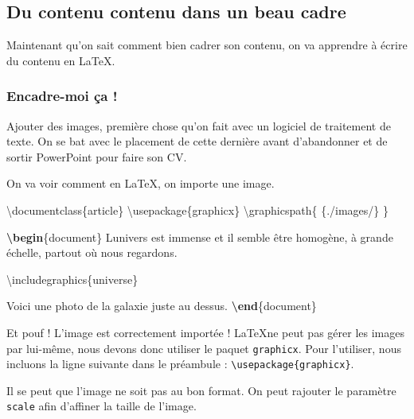 \documentclass[A4paper
]{article}
\newenvironment{Shaded}{}{}
\newcommand{\BuiltInTok}[1]{#1}
\newcommand{\ExtensionTok}[1]{#1}
\newcommand{\FunctionTok}[1]{\textcolor[rgb]{0.02,0.16,0.49}{#1}}
\newcommand{\KeywordTok}[1]{\textcolor[rgb]{0.00,0.44,0.13}{\textbf{#1}}}
\newcommand{\NormalTok}[1]{#1}
\begin{document}
\hypertarget{du-contenu-contenu-dans-un-beau-cadre}{%
\subsection{Du contenu contenu dans un beau
cadre}\label{du-contenu-contenu-dans-un-beau-cadre}}

Maintenant qu'on sait comment bien cadrer son contenu, on va apprendre à
écrire du contenu en \LaTeX.

\hypertarget{encadre-moi-uxe7a}{%
\subsubsection{Encadre-moi ça !}\label{encadre-moi-uxe7a}}

Ajouter des images, première chose qu'on fait avec un logiciel de
traitement de texte. On se bat avec le placement de cette dernière avant
d'abandonner et de sortir PowerPoint pour faire son CV.

On va voir comment en \LaTeX, on importe une image.

\begin{Shaded}
\begin{Highlighting}[]
\BuiltInTok{\textbackslash{}documentclass}\NormalTok{\{}\ExtensionTok{article}\NormalTok{\}}
\BuiltInTok{\textbackslash{}usepackage}\NormalTok{\{}\ExtensionTok{graphicx}\NormalTok{\}}
\FunctionTok{\textbackslash{}graphicspath}\NormalTok{\{ \{./images/\} \}}

\KeywordTok{\textbackslash{}begin}\NormalTok{\{}\ExtensionTok{document}\NormalTok{\}}
\NormalTok{L\textquotesingle{}univers est immense et il semble être homogène, }
\NormalTok{à grande échelle, partout où nous regardons.}

\BuiltInTok{\textbackslash{}includegraphics}\NormalTok{\{}\ExtensionTok{universe}\NormalTok{\}}

\NormalTok{Voici une photo de la galaxie juste au dessus.}
\KeywordTok{\textbackslash{}end}\NormalTok{\{}\ExtensionTok{document}\NormalTok{\}}
\end{Highlighting}
\end{Shaded}

Et pouf ! L'image est correctement importée ! \LaTeX ne peut pas gérer
les images par lui-même, nous devons donc utiliser le paquet
\texttt{graphicx}. Pour l'utiliser, nous incluons la ligne suivante dans
le préambule : \texttt{\textbackslash{}usepackage\{graphicx\}}.

Il se peut que l'image ne soit pas au bon format. On peut rajouter le
paramètre \texttt{scale} afin d'affiner la taille de l'image.
\end{document}
